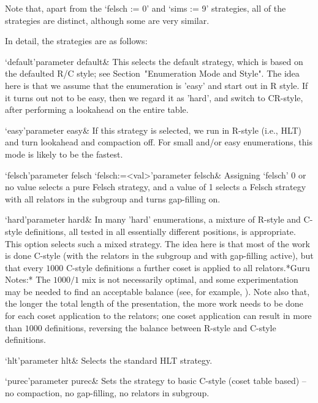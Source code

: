     Note that, apart from the `felsch := 0' and `sims := 9' strategies, all
    of the strategies are distinct, although some are very similar.

    In detail, the strategies are as follows:

    \beginitems

    \>`default'{parameter default}&
    This selects the default strategy, which is based on the defaulted R/C
    style;  see Section~"Enumeration Mode  and Style".   The idea  here is
    that  we assume  that the  enumeration is  'easy' and  start out  in R
    style.  If it turns  out not to be easy, then we  regard it as 'hard',
    and switch  to CR-style, after performing  a lookahead on  the entire
    table.

    \>`easy'{parameter easy}&
    If this strategy  is selected, we run in R-style  (i.e., HLT) and turn
    lookahead  and compaction  off.  For  small and/or  easy enumerations,
    this mode is likely to be the fastest.

    \>`felsch'{parameter felsch}
    \>`felsch:=<val>'{parameter felsch}&
    Assigning `felsch' 0 or no value selects a pure Felsch strategy, and a
    value of 1 selects a Felsch strategy with all relators in the subgroup
    and turns gap-filling on.

    \>`hard'{parameter hard}&  In many  'hard' enumerations, a  mixture of
    R-style  and  C-style  definitions,  all  tested  in  all  essentially
    different positions, is appropriate.  This option selects such a mixed
    strategy.  The  idea here  is that  most of the  work is  done C-style
    (with the relators  in the subgroup and with  gap-filling active), but
    that every  $1000$ C-style definitions  a further coset is  applied to
    all  relators.*Guru  Notes:*  The  $1000/1$  mix  is  not  necessarily
    optimal, and some experimentation may  be needed to find an acceptable
    balance (see,  for example, \cite{HR99}).   Note also that,  the longer
    the total length  of the presentation, the more work  needs to be done
    for each coset application to  the relators; one coset application can
    result in more than  $1000$ definitions, reversing the balance between
    R-style and C-style definitions.

    \>`hlt'{parameter hlt}&
    Selects the standard HLT strategy.

    \>`purec'{parameter purec}&
    Sets  the  strategy  to  basic  C-style  (coset  table  based)  --  no
    compaction, no gap-filling, no relators in subgroup.

